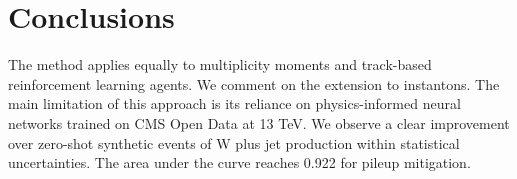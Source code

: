\section{Conclusions}\label{sec:conclusions}

The method applies equally to multiplicity moments and track-based
reinforcement learning agents. We comment on the extension to
instantons. The main limitation of this approach is its reliance on
physics-informed neural networks trained on CMS Open Data at 13 TeV. We
observe a clear improvement over zero-shot synthetic events of W plus
jet production within statistical uncertainties. The area under the
curve reaches 0.922 for pileup mitigation.

